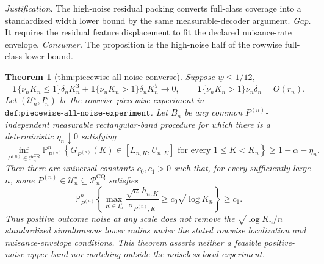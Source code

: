 \documentclass{article}
\newtheorem{theorem}{Theorem}
\begin{document}
\par\smallskip\noindent \textit{Justification.} The high-noise residual packing converts full-class coverage into a standardized width lower bound by the same measurable-decoder argument. \textit{Gap.} It requires the residual feature displacement to fit the declared nuisance-rate envelope. \textit{Consumer.} The proposition is the high-noise half of the rowwise full-class lower bound.

\begin{theorem}[thm:piecewise-all-noise-converse]\label{thm:piecewise-all-noise-converse}
Suppose \(\underline w\leq1/12\),
\[
 \mathbf1\{\nu_nK_n\leq1\}\delta_nK_n^3
 +\mathbf1\{\nu_nK_n>1\}\delta_nK_n^5\to0,
 \qquad
 \mathbf1\{\nu_nK_n>1\}\nu_n\delta_n=O(r_n).
\]
Let \((\mathcal U_n^\star,I_n^\star)\) be the rowwise piecewise experiment in \(\texttt{def:piecewise-all-noise-experiment}\).  Let \(B_n\) be any common \(P^{(n)}\)-independent measurable rectangular-band procedure for which there is a deterministic \(\eta_n\downarrow0\) satisfying
\[
 \inf_{P^{(n)}\in\mathcal P_n^{\mathrm{CQ}}}
 \mathbb P_{P^{(n)}}^n\!\left\{G_{P^{(n)}}(K)\in[L_{n,K},U_{n,K}]
 \text{ for every }1\leq K<K_n\right\}\geq1-\alpha-\eta_n.
\]
Then there are universal constants \(c_0,c_1>0\) such that, for every sufficiently large \(n\), some \(P^{(n)}\in\mathcal U_n^\star\subseteq\mathcal P_n^{\mathrm{CQ}}\) satisfies
\[
 \mathbb P_{P^{(n)}}^n\!\left\{
 \max_{K\in I_n^\star}\frac{\sqrt n\,h_{n,K}}{\sigma_{P^{(n)},K}}
 \geq c_0\sqrt{\log K_n}\right\}\geq c_1.
\]
Thus positive outcome noise at any scale does not remove the \(\sqrt{\log K_n/n}\) standardized simultaneous lower radius under the stated rowwise localization and nuisance-envelope conditions.  This theorem asserts neither a feasible positive-noise upper band nor matching outside the noiseless local experiment.
\end{theorem}
\end{document}
